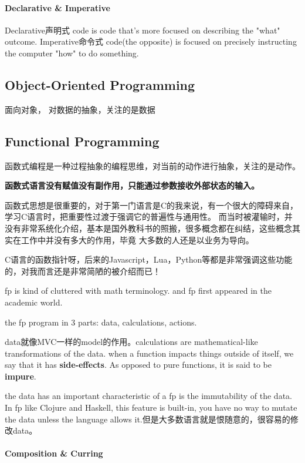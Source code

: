 \paragraph{Declarative \& Imperative}

Declarative声明式 code is code that's more focused on describing the "what" outcome.
Imperative命令式 code(the opposite) is focused on precisely instructing the computer "how" to do something.

\subsection{Object-Oriented Programming}

面向对象， 对数据的抽象，关注的是数据


\subsection{Functional Programming}

函数式编程是一种过程抽象的编程思维，对当前的动作进行抽象，关注的是动作。

\textbf{函数式语言没有赋值没有副作用，只能通过参数接收外部状态的输入。}

函数式思想是很重要的，对于第一门语言是C的我来说，有一个很大的障碍来自，学习C语言时，把重要性过渡于强调它的普遍性与通用性。
而当时被灌输时，并没有非常系统化介绍，基本是国外教科书的照搬，很多概念都在纠结，这些概念其实在工作中并没有多大的作用，毕竟
大多数的人还是以业务为导向。

C语言的函数指针呀，后来的Javascript，Lua，Python等都是非常强调这些功能的，对我而言还是非常简陋的被介绍而已！

fp is kind of cluttered with math terminology. and fp  first appeared in the academic world.

the fp program in 3 parts: data, calculations, actions. 

data就像MVC一样的model的作用。calculations are mathematical-like transformations of the data. when a function impacts things
outside of itself, we say that it has \textbf{side-effects}. As opposed to pure functions, it is said to be \textbf{impure}.

the data has an important characteristic of a fp is the immutability of the data. In fp like Clojure and Haskell, this feature
is built-in, you have no way to mutate the data unless the language allows it.但是大多数语言就是恨随意的，很容易的修改data。

\paragraph{Composition \& Curring }

